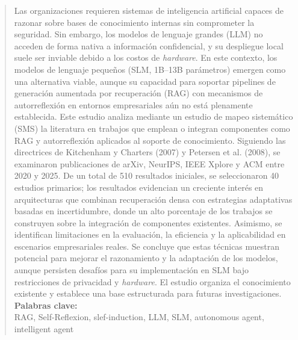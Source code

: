 \begin{abstract}
	Las organizaciones requieren sistemas de inteligencia artificial capaces de razonar sobre bases de conocimiento internas sin comprometer la seguridad. Sin embargo, los modelos de lenguaje grandes (LLM) no acceden de forma nativa a información confidencial, y su despliegue local suele ser inviable debido a los costos de \textit{hardware}. En este contexto, los modelos de lenguaje pequeños (SLM, 1B–13B parámetros) emergen como una alternativa viable, aunque su capacidad para soportar pipelines de generación aumentada por recuperación (RAG) con mecanismos de autorreflexión en entornos empresariales aún no está plenamente establecida. Este estudio analiza mediante un estudio de mapeo sistemático (SMS) la literatura en trabajos que emplean o integran componentes como RAG y autorreflexión aplicados al soporte de conocimiento. Siguiendo las directrices de Kitchenham y Charters (2007) y Petersen et al. (2008), se examinaron publicaciones de arXiv, NeurIPS, IEEE Xplore y ACM entre 2020 y 2025. De un total de 510 resultados iniciales, se seleccionaron 40 estudios primarios; los resultados evidencian un creciente interés en arquitecturas que combinan recuperación densa con estrategias adaptativas basadas en incertidumbre, donde un alto porcentaje de los trabajos se construyen sobre la integración de componentes existentes. Asimismo, se identifican limitaciones en la evaluación, la eficiencia y la aplicabilidad en escenarios empresariales reales. Se concluye que estas técnicas muestran potencial para mejorar el razonamiento y la adaptación de los modelos, aunque persisten desafíos para su implementación en SLM bajo restricciones de privacidad y \textit{hardware}. El estudio organiza el conocimiento existente y establece una base estructurada para futuras investigaciones.\\
	
	\noindent\textbf{Palabras clave:}\\
	RAG, Self-Reflexion, slef-induction, LLM, SLM, autonomous agent, intelligent agent
\end{abstract}

\newpage


